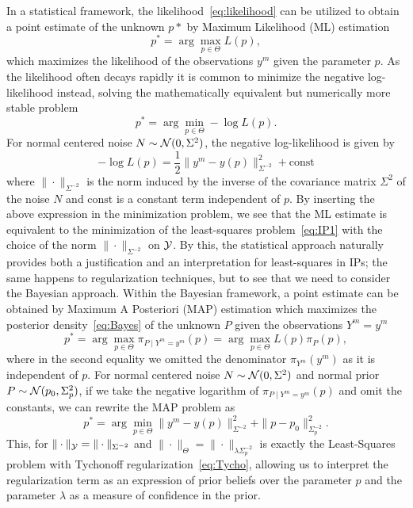 In a statistical framework, the likelihood~\eqref{eq:likelihood} can be utilized to obtain a point estimate of the unknown $p*$ by Maximum Likelihood (ML) estimation
\begin{equation}\label{eq:ML}
    p^* = \arg \max_{p \in \Theta} L(p),
\end{equation}
which maximizes the likelihood of the observations $y^m$ given the parameter $p$.
As the likelihood often decays rapidly it is common to minimize the negative log-likelihood instead, solving the mathematically equivalent but numerically more stable problem \[
    p^* = \arg \min_{p \in \Theta} -\log L(p).
\]
For normal centered noise $N \sim \mathcal N(0, \Sigma^2)$, the negative log-likelihood is given by
\[
    -\log L(p) = \frac{1}{2} \| y^m - y(p) \|_{\Sigma^{-2}}^2 + \text{const}
\]
where $\| \cdot \|_{\Sigma^{-2}}$ is the norm induced by the inverse of the covariance matrix $\Sigma^2$ of the noise $N$ and $\text{const}$ is a constant term independent of $p$. 
By inserting the above expression in the minimization problem, we see that the ML estimate is equivalent to the minimization of the least-squares problem~\eqref{eq:IP1} with the choice of the norm $\| \cdot \|_{\Sigma^{-2}}$ on $\mathcal Y$.
By this, the statistical approach naturally provides both a justification and an interpretation for least-squares in IPs; the same happens to regularization techniques, but to see that we need to consider the Bayesian approach. \newline
Within the Bayesian framework, a point estimate can be obtained by Maximum A Posteriori (MAP) estimation which maximizes the posterior density~\eqref{eq:Bayes} of the unknown $P$ given the observations $Y^m=y^m$
\[
    p^* = \arg \max_{p \in \Theta} \pi_{P\mid Y^m = y^m}(p) = \arg \max_{p \in \Theta} L(p) \pi_P(p),
\]
where in the second equality we omitted the denominator $\pi_{Y^m}(y^m)$ as it is independent of $p$.
For normal centered noise $N \sim \mathcal N(0, \Sigma^2)$ and normal prior $P \sim \mathcal N(p_0, \Sigma_p^2)$, if we take the negative logarithm of $\pi_{P\mid Y^m = y^m}(p)$ and omit the constants, we can rewrite the MAP problem as
\[
    p^* = \arg \min_{p \in \Theta} \|y^m - y(p) \|_{\Sigma^{-2}}^2 + \|p - p_0 \|_{\Sigma_p^{-2}}^2.
\] 
This, for $\|\cdot \|_\mathcal Y = \|\cdot \|_{\Sigma^{-2}}$ and $\|\cdot \|_\Theta = \|\cdot \|_{ \lambda \Sigma_p^{-2}}$ is exactly the Least-Squares problem with Tychonoff regularization~\eqref{eq:Tycho}, allowing us to interpret the regularization term as an expression of prior beliefs over the parameter $p$ and the parameter $\lambda$ as a measure of confidence in the prior.
\medskip


